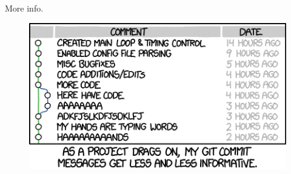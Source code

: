 \documentclass{beamer}
\begin{document}
\begin{frame}{More info.}
\end{frame}

\begin{frame}
    \begin{figure}
        \includegraphics[height=.4\textheight]{git_commit}
        \label{fig:xkcd-git-commit}
    \end{figure}
\end{frame}
\end{document}
